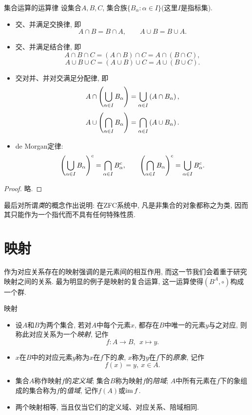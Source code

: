 \begin{proposition}{集合运算的运算律}
	设集合$A, B, C$, 集合族$\{ B_{\alpha} :  \alpha \in I \}$(这里$I$是指标集). 
	\begin{itemize}
		\item 交、并满足交换律, 即$$A \cap B = B \cap A,  \qquad A \cup B = B \cup A.$$
		\item 交、并满足结合律, 即
	$$A \cap B \cap C = (A \cap B) \cap C = A \cap (B \cap C), $$
	$$A \cup B \cup C = (A \cup B) \cup C = A \cup (B \cup C).$$
		\item 交对并、并对交满足分配律, 即
	$$A \cap \left( \bigcup_{\alpha \in I} B_\alpha \right) = \bigcup_{\alpha \in I} \left( A \cap B_{\alpha} \right), $$
	$$A \cup \left( \bigcap_{\alpha \in I} B_\alpha \right) = \bigcap_{\alpha \in I} \left( A \cup B_{\alpha} \right).$$
		\item de Morgan定律: 
	$$\left( \bigcup_{\alpha \in I}B_{\alpha}  \right)^c = \bigcap_{\alpha \in I} B_{\alpha}^c, \qquad \left( \bigcap_{\alpha \in I}B_{\alpha}  \right)^c = \bigcup_{\alpha \in I} B_{\alpha}^c.$$
	\end{itemize}
\end{proposition}
\begin{proof}
	略. 
\end{proof}

最后对所谓\textit{类}的概念作出说明: 在ZFC系统中, 凡是非集合的对象都称之为类, 因而其只能作为一个指代而不具有任何特殊性质. 

\section{映射}

作为对应关系存在的映射强调的是元素间的相互作用, 而这一节我们会着重于研究映射之间的关系. 最为明显的例子是映射的复合运算, 这一运算使得$(B^{A},\circ)$构成一个群. 

\begin{definition}{映射}
	\vspace{-2em}
	\begin{itemize}
		\item 设$A$和$B$为两个集合, 若对$A$中每个元素$x$, 都存在$B$中唯一的元素$y$与之对应, 则称此对应关系为一个\textit{映射}, 记作$$f: A \to B, ~~x \mapsto y.$$
		\item $x$在$B$中的对应元素$y$称为$x$在$f$下的\textit{象}, $x$称为$y$在$f$下的\textit{原象}, 记作$$f(x) = y, ~ x \in A.$$
		\item 集合$A$称作映射$f$的\textit{定义域}; 集合$B$称为映射$f$的\textit{陪域}; $A$中所有元素在$f$下的象组成的集合称为$f$的\textit{值域}, 记作$f(A)$或$\operatorname{im} f$.
		\item 两个映射相等, 当且仅当它们的定义域、对应关系、陪域相同.
	\end{itemize}
\end{definition}

